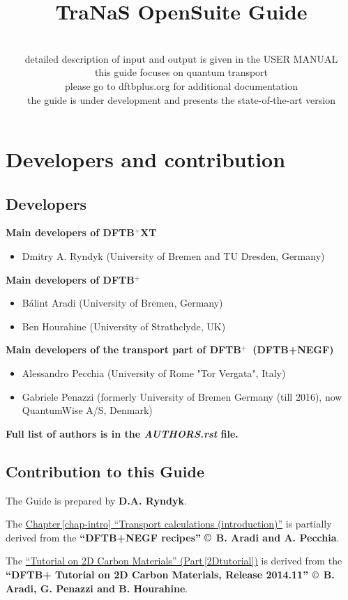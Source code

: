 \documentclass[a4paper,11pt,english]{sphinxmanual}
\title{TraNaS OpenSuite Guide}
\author{}
\date{\normalfont\sffamily {tranas.org/opensuite}\\[0.2cm]
  detailed description of input and output is given in the \dftbpxt USER MANUAL \\[0.2cm]
  this guide focuses on quantum transport \\
  please go to {dftbplus.org} for additional \dftbp documentation  \\[0.2cm]
  the guide is under development and presents the state-of-the-art version}
\newcommand{\dftbp}{\textsf{DFTB$^{\text{+}}$\ }} %
\newcommand{\dftbpxt}{\textsf{DFTB$^{\text{+}}$XT\ }} %
\begin{document}
\maketitle

\chapter*{\Large\bf\sffamily Developers and contribution}

\section*{Developers}

{\bf Main developers of \dftbpxt}
\begin{itemize}
\item Dmitry A. Ryndyk (University of Bremen and TU Dresden, Germany)
\end{itemize}
  
{\bf Main developers of \dftbp}
\begin{itemize}
\item Bálint Aradi (University of Bremen, Germany)
\item Ben Hourahine (University of Strathclyde, UK)
\end{itemize}
  
{\bf Main developers of the transport part of \dftbp (DFTB+NEGF)}
\begin{itemize}
\item Alessandro Pecchia (University of Rome "Tor Vergata", Italy)
\item Gabriele Penazzi (formerly University of Bremen Germany (till 2016), now QuantumWise A/S, Denmark)
\end{itemize}

{\bf Full list of authors is in the \emph{AUTHORS.rst} file.}

\section*{Contribution to this Guide}

The Guide is prepared by {\bf D.A. Ryndyk}.

The {\hyperref[chap-intro]{Chapter\,\ref{chap-intro} ``Transport calculations (introduction)''}} is partially derived from the {\bf ``DFTB+NEGF recipes'' $\copyright$ B. Aradi and A. Pecchia}.   

The {\hyperref[2Dtutorial]{``Tutorial on 2D Carbon Materials'' (Part\,\ref{2Dtutorial})}} is derived from the {\bf ``DFTB+ Tutorial on 2D Carbon Materials, Release 2014.11'' $\copyright$ B. Aradi, G. Penazzi and B. Hourahine}.    
    
\end{document}
